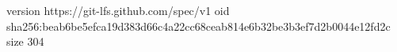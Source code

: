 version https://git-lfs.github.com/spec/v1
oid sha256:beab6be5efca19d383d66c4a22cc68ceab814e6b32be3b3ef7d2b0044e12fd2c
size 304
